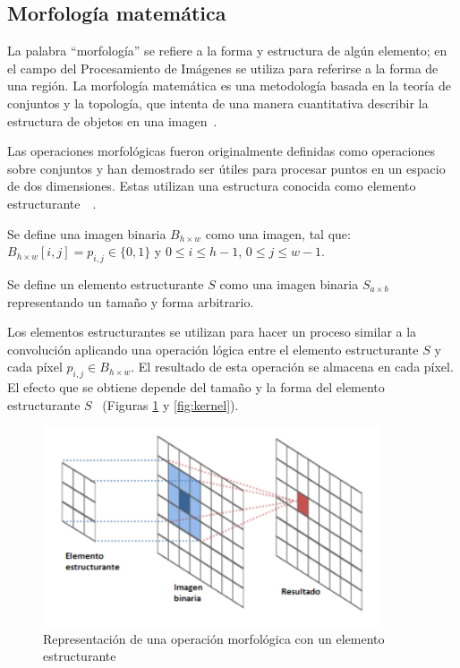 \subsection{Morfología matemática}

La palabra ``morfología'' se refiere a la forma y estructura de algún elemento; en el campo del Procesamiento de Imágenes se utiliza para referirse a la forma de una región. La morfología matemática es una metodología basada en la teoría de conjuntos y la topología, que intenta de una manera cuantitativa describir la estructura de objetos en una imagen~\cite{bovik2009essential}.

Las operaciones morfológicas fueron originalmente definidas como operaciones sobre conjuntos y han demostrado ser útiles para procesar puntos en un espacio de dos dimensiones. Estas utilizan una estructura conocida como elemento estructurante~\cite{soille1999morphological}~\cite{haralick1987image}.

\begin{definition}
	Se define una imagen binaria $B_{h \times w}$ como una imagen, tal que: $B_{h \times w}[i, j] = p_{i, j} \in \{0, 1\}$ y $0 \leq i \leq h - 1$, $ 0 \leq j \leq w-1$.
\end{definition}

\begin{definition}
	Se define un elemento estructurante $S$ como una imagen binaria $S_{a \times b}$ representando un tamaño y forma arbitrario.
\end{definition}

Los elementos estructurantes se utilizan para hacer un proceso similar a la convolución aplicando una operación lógica entre el elemento estructurante $S$ y cada píxel $p_{i, j} \in B_{h \times w}$. El resultado de esta operación se almacena en cada píxel. El efecto que se obtiene depende del tamaño y la forma del elemento estructurante $S$~\cite{castleman1996digital} (Figuras \ref{fig:estructurante} y \ref{fig:kernel}).

\begin{figure}[ht]
	\centering
	\includegraphics[width=10cm]{./Graphics/estructurante.png}
	\caption{Representación de una operación morfológica con un elemento estructurante}
	\label{fig:estructurante}
\end{figure}	

